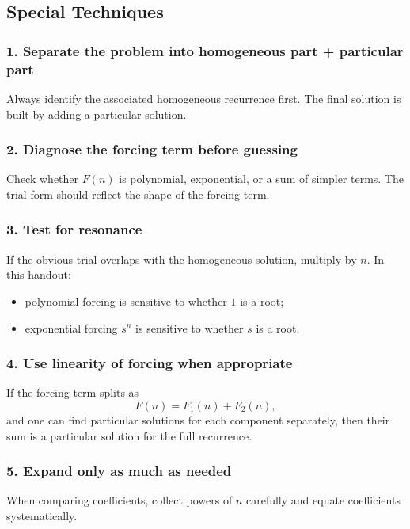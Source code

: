 \subsection{Special Techniques}

\subsubsection*{1. Separate the problem into homogeneous part + particular part}
Always identify the associated homogeneous recurrence first. The final solution is built by adding a particular solution.

\subsubsection*{2. Diagnose the forcing term before guessing}
Check whether \(F(n)\) is polynomial, exponential, or a sum of simpler terms. The trial form should reflect the shape of the forcing term.

\subsubsection*{3. Test for resonance}
If the obvious trial overlaps with the homogeneous solution, multiply by \(n\). In this handout:
\begin{itemize}[leftmargin=*]
\item polynomial forcing is sensitive to whether \(1\) is a root;
\item exponential forcing \(s^n\) is sensitive to whether \(s\) is a root.
\end{itemize}

\subsubsection*{4. Use linearity of forcing when appropriate}
If the forcing term splits as
\[
F(n)=F_1(n)+F_2(n),
\]
and one can find particular solutions for each component separately, then their sum is a particular solution for the full recurrence.

\subsubsection*{5. Expand only as much as needed}
When comparing coefficients, collect powers of \(n\) carefully and equate coefficients systematically.

